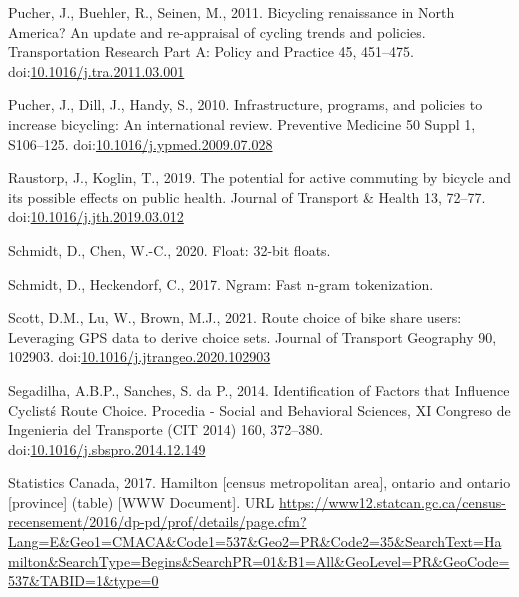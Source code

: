 \documentclass[]{elsarticle} %
\begin{document}
\leavevmode\hypertarget{ref-pucherBicyclingRenaissanceNorth2011a}{}%
Pucher, J., Buehler, R., Seinen, M., 2011. Bicycling renaissance in
North America? An update and re-appraisal of cycling trends and
policies. Transportation Research Part A: Policy and Practice 45,
451--475.
doi:\href{https://doi.org/10.1016/j.tra.2011.03.001}{10.1016/j.tra.2011.03.001}

\leavevmode\hypertarget{ref-pucherInfrastructureProgramsPolicies2010a}{}%
Pucher, J., Dill, J., Handy, S., 2010. Infrastructure, programs, and
policies to increase bicycling: An international review. Preventive
Medicine 50 Suppl 1, S106--125.
doi:\href{https://doi.org/10.1016/j.ypmed.2009.07.028}{10.1016/j.ypmed.2009.07.028}

\leavevmode\hypertarget{ref-raustorpPotentialActiveCommuting2019}{}%
Raustorp, J., Koglin, T., 2019. The potential for active commuting by
bicycle and its possible effects on public health. Journal of Transport
\& Health 13, 72--77.
doi:\href{https://doi.org/10.1016/j.jth.2019.03.012}{10.1016/j.jth.2019.03.012}

\leavevmode\hypertarget{ref-R-float}{}%
Schmidt, D., Chen, W.-C., 2020. Float: 32-bit floats.

\leavevmode\hypertarget{ref-R-ngram}{}%
Schmidt, D., Heckendorf, C., 2017. Ngram: Fast n-gram tokenization.

\leavevmode\hypertarget{ref-scottRouteChoiceBike2021}{}%
Scott, D.M., Lu, W., Brown, M.J., 2021. Route choice of bike share
users: Leveraging GPS data to derive choice sets. Journal of Transport
Geography 90, 102903.
doi:\href{https://doi.org/10.1016/j.jtrangeo.2020.102903}{10.1016/j.jtrangeo.2020.102903}

\leavevmode\hypertarget{ref-segadilhaIdentificationFactorsThat2014a}{}%
Segadilha, A.B.P., Sanches, S. da P., 2014. Identification of Factors
that Influence Cyclistś Route Choice. Procedia - Social and Behavioral
Sciences, XI Congreso de Ingenieria del Transporte (CIT 2014) 160,
372--380.
doi:\href{https://doi.org/10.1016/j.sbspro.2014.12.149}{10.1016/j.sbspro.2014.12.149}

\leavevmode\hypertarget{ref-Statistics2016}{}%
Statistics Canada, 2017. Hamilton {[}census metropolitan area{]},
ontario and ontario {[}province{]} (table) {[}WWW Document{]}. URL
\url{https://www12.statcan.gc.ca/census-recensement/2016/dp-pd/prof/details/page.cfm?Lang=E\&Geo1=CMACA\&Code1=537\&Geo2=PR\&Code2=35\&SearchText=Hamilton\&SearchType=Begins\&SearchPR=01\&B1=All\&GeoLevel=PR\&GeoCode=537\&TABID=1\&type=0}
\end{document}
